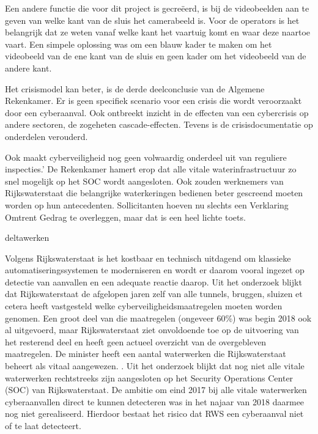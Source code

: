 Een andere functie die voor dit project is gecreëerd, is bij de videobeelden aan te geven van welke kant van de sluis het camerabeeld is. Voor de operators is het belangrijk dat ze weten vanaf welke kant het vaartuig komt en waar deze naartoe vaart. Een simpele oplossing was om een blauw kader te maken om het videobeeld van de ene kant van de sluis en geen kader om het videobeeld van de andere kant. 

 
\cite{thkwaterwerken}
Het crisismodel kan beter, is de derde deelconclusie van de Algemene Rekenkamer. Er is geen specifiek scenario voor een crisis die wordt veroorzaakt door een cyberaanval. Ook ontbreekt inzicht in de effecten van een cybercrisis op andere sectoren, de zogeheten cascade-effecten. Tevens is de crisisdocumentatie op onderdelen verouderd.
 
\cite{rekenkamercybersecWater}
Ook maakt cyberveiligheid nog geen volwaardig onderdeel uit van reguliere inspecties.’ De Rekenkamer hamert erop dat alle vitale waterinfrastructuur zo snel mogelijk op het SOC wordt aangesloten. Ook zouden werknemers van Rijkswaterstaat die belangrijke waterkeringen bedienen beter gescreend moeten worden op hun antecedenten. Sollicitanten hoeven nu slechts een Verklaring Omtrent Gedrag te overleggen, maar dat is een heel lichte toets.
 
\cite{hackerWaterwerk}
deltawerken

\cite{kramerZeeland}
Volgens Rijkswaterstaat is het kostbaar en technisch uitdagend om klassieke automatiseringssystemen te moderniseren en wordt er daarom vooral ingezet op detectie van aanvallen en een adequate reactie daarop.
Uit het onderzoek blijkt dat Rijkswaterstaat de afgelopen jaren zelf van alle tunnels, bruggen, sluizen et cetera heeft vastgesteld welke cyberveiligheidsmaatregelen moeten worden genomen. Een groot deel van die maatregelen (ongeveer 60\%) was begin 2018 ook al uitgevoerd, maar Rijkswaterstaat ziet onvoldoende toe op de uitvoering van het resterend deel en heeft geen actueel overzicht van de overgebleven maatregelen.
De minister heeft een aantal waterwerken die Rijkswaterstaat beheert als vitaal aangewezen. . Uit het onderzoek blijkt dat nog niet alle vitale waterwerken rechtstreeks zijn aangesloten op het Security Operations Center (SOC) van Rijkswaterstaat. De ambitie om eind 2017 bij alle vitale waterwerken cyberaanvallen direct te kunnen detecteren was in het najaar van 2018 daarmee nog niet gerealiseerd. Hierdoor bestaat het risico dat RWS een cyberaanval niet of te laat detecteert.
 
